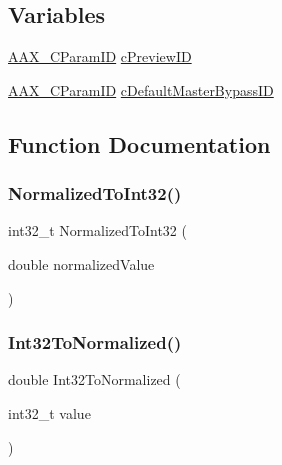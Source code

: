 \subsection*{Variables}
\begin{DoxyCompactItemize}
\item 
\mbox{\hyperlink{a00392_a1440c756fe5cb158b78193b2fc1780d1}{A\+A\+X\+\_\+\+C\+Param\+ID}} \mbox{\hyperlink{a00428_a5b9f7125f80d7c522dc67dd9a3af3b8c}{c\+Preview\+ID}}
\item 
\mbox{\hyperlink{a00392_a1440c756fe5cb158b78193b2fc1780d1}{A\+A\+X\+\_\+\+C\+Param\+ID}} \mbox{\hyperlink{a00428_a749f638fe14300285783bde128dfd390}{c\+Default\+Master\+Bypass\+ID}}
\end{DoxyCompactItemize}


\subsection{Function Documentation}
\mbox{\label{a00428_a4306a7c219b052f8d50910b40247805f}} 
\subsubsection{\texorpdfstring{NormalizedToInt32()}{NormalizedToInt32()}}
{\footnotesize\ttfamily int32\+\_\+t Normalized\+To\+Int32 (\begin{DoxyParamCaption}\item[{double}]{normalized\+Value }\end{DoxyParamCaption})}

\mbox{\label{a00428_aae1cabc9311a708ba440fc539607e68b}} 
\subsubsection{\texorpdfstring{Int32ToNormalized()}{Int32ToNormalized()}}
{\footnotesize\ttfamily double Int32\+To\+Normalized (\begin{DoxyParamCaption}\item[{int32\+\_\+t}]{value }\end{DoxyParamCaption})}

